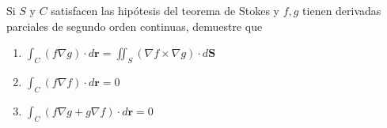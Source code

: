 \item Si $S$ y $C$ satisfacen las hipótesis del teorema de Stokes y $f, g$ tienen derivadas parciales de segundo orden continuas, demuestre que
    \begin{enumerate}
        \item[(a)] $\int_C (f \nabla g) \cdot d\mathbf{r} = \iint_S (\nabla f \times \nabla g) \cdot d\mathbf{S}$
        \item[(b)] $\int_C (f \nabla f) \cdot d\mathbf{r} = 0$
        \item[(c)] $\int_C (f \nabla g + g \nabla f) \cdot d\mathbf{r} = 0$
    \end{enumerate}
